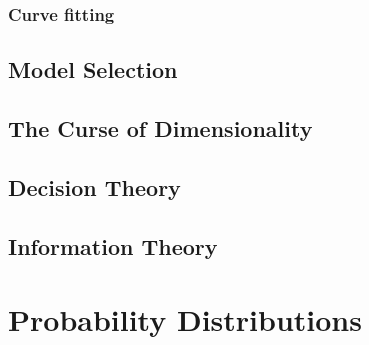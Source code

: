 \documentclass[11pt]{article}
\begin{document}
\subsubsection{Curve fitting}
\label{sec:org8eba113}
\subsection{Model Selection}
\label{sec:org4bf5f99}
\subsection{The Curse of Dimensionality}
\label{sec:org1121f76}
\subsection{Decision Theory}
\label{sec:org16e1d2c}
\subsection{Information Theory}
\label{sec:org26185d5}
\section{Probability Distributions}
\label{sec:orgebf14cb}
\end{document}
